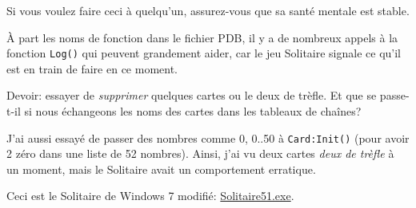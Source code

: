 Si vous voulez faire ceci à quelqu'un, assurez-vous que sa santé mentale est stable.

À part les noms de fonction dans le fichier PDB, il y a de nombreux appels à la
fonction \verb|Log()| qui peuvent grandement aider,
car le jeu Solitaire signale ce qu'il est en train de faire en ce moment.

Devoir: essayer de \textit{supprimer} quelques cartes ou le deux de trèfle.
Et que se passe-t-il si nous échangeons les noms des cartes dans les tableaux de
chaînes?

J'ai aussi essayé de passer des nombres comme 0, 0..50 à \verb|Card:Init()| (pour
avoir 2 zéro dans une liste de 52 nombres).
Ainsi, j'ai vu deux cartes \textit{deux de trèfle} à un moment, mais le Solitaire
avait un comportement erratique.

Ceci est le Solitaire de Windows 7 modifié:
\href{\GitHubBlobMasterURL/examples/solitaire/51/Solitaire51.exe}{Solitaire51.exe}.


